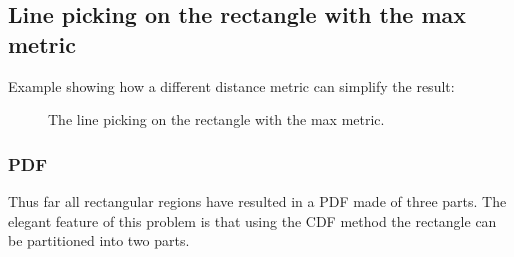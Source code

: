 \subsection{Line picking on the rectangle with the max metric}
\label{sec:rect_manhattan}

Example showing how a different distance metric can simplify the result: 

\begin{figure}[tbp]
  \begin{center}
      \hspace{3mm}
    \caption{The line picking on the rectangle with the max metric.}
  \end{center} 
\vspace{-4mm}
\end{figure}  

\subsubsection{PDF}

Thus far all rectangular regions have resulted in a PDF made of three parts.
The elegant feature of this problem is that using the CDF method the rectangle 
can be partitioned into two parts. 

